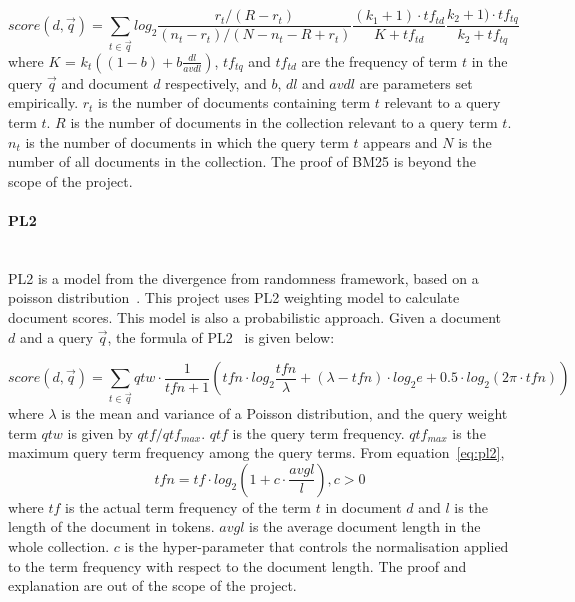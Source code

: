 \begin{equation}\label{eq:BM25}
score(d, \vec{q}) = \sum_{t \in \vec{q}} log_2 \frac{r_t/(R - r_t)}{(n_t - r_t)/(N - n_t - R + r_t)} \frac{(k_1 + 1)\cdot tf_{td}}{K + tf_{td}} \frac{k_2 + 1)\cdot tf_{tq}}{k_2 + tf_{tq}}
\end{equation}
where $K$ = $k_t((1 - b) + b\frac{dl}{avdl})$, $tf_{tq}$ and $tf_{td}$ are the frequency of term $t$ in the query $\vec{q}$ and document $d$ respectively,
and $b$, $dl$ and $avdl$ are parameters set empirically. $r_t$ is the number of documents containing term $t$ relevant to a query term $t$. 
$R$ is the number of documents in the collection relevant to a query term $t$. $n_t$ is the number of documents in which the query term $t$ appears and
$N$ is the number of all documents in the collection. The proof of BM25 is beyond the scope of the project.

\paragraph{PL2} \hspace{0pt} \\
PL2 is a model from the divergence from randomness framework, based on a poisson distribution~\cite{craig}. This project uses PL2 weighting model to 
calculate document scores. This model is also a probabilistic approach. Given a document $d$ and a query $\vec{q}$, the formula of PL2~\cite[P. 23-24]{craigthesis} is given below:

\begin{equation}\label{eq:pl2}
 score(d, \vec{q}) = \sum_{t \in \vec{q}} qtw\cdot \frac{1}{tfn + 1}(tfn\cdot log_2\frac{tfn}{\lambda} + 
 (\lambda - tfn)\cdot log_2e + 0.5\cdot log_2(2\pi \cdot tfn))
\end{equation}
where $\lambda$ is the mean and variance of a Poisson distribution, and the query weight term $qtw$ is given by $qtf/qtf_{max}$.
$qtf$ is the query term frequency. $qtf_{max}$ is the maximum query term frequency among the query terms. From equation~\ref{eq:pl2}, 
\[tfn = tf\cdot log_2(1 + c\cdot \frac{avgl}{l}), c > 0\]
where $tf$ is the actual term frequency of the term $t$ in document $d$ and $l$ is the length of the
document in tokens. $avgl$ is the average document length in the whole collection.
$c$ is the hyper-parameter that controls the normalisation applied to the term frequency
with respect to the document length.
The proof and explanation are out of the scope of the project.


